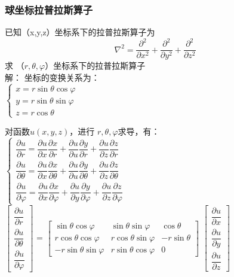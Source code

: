 \begin{frame}
	\frametitle{ 球坐标拉普拉斯算子 }
	已知（x,y,z）坐标系下的拉普拉斯算子为
	\begin{equation*}
		\nabla ^{2}  = \dfrac{\partial ^2}{\partial x^2} +\dfrac{\partial^2 }{\partial y^2} +\dfrac{\partial^2  }{\partial z^2}
	\end{equation*}
	求 （$r, \theta, \varphi $）坐标系下的拉普拉斯算子 \\ \vspace{0.3cm}
	\alert{解：}  坐标的变换关系为：\\
	$\begin{cases}
		x= r\sin \theta \cos \varphi \\
		y= r\sin \theta \sin \varphi \\
		z=r\cos \theta
	\end{cases} $
\end{frame}	

\begin{frame}
	对函数$u(x,y,z)$，进行 $r, \theta, \varphi $求导，有：\\
	{\small $\begin{cases}
		\dfrac{\partial {u}}{\partial {r}}=\dfrac{\partial {u}}{\partial x} \dfrac{\partial {x}}{\partial {r}}+\dfrac{\partial u}{\partial {u}} \dfrac{\partial {y}}{\partial {r}}+\dfrac{\partial u}{\partial z} \dfrac{\partial z}{\partial {r}} \\
		\dfrac{\partial {u}}{\partial \theta}=\dfrac{\partial {u}}{\partial x} \dfrac{\partial{x}}{\partial \theta}+\dfrac{\partial u}{\partial {u}} \dfrac{\partial {y}}{\partial \theta}+\dfrac{\partial{u}}{\partial z} \dfrac{\partial z}{\partial \theta} \\
		\dfrac{\partial {u}}{\partial \varphi}=\dfrac{\partial u}{\partial x} \dfrac{\partial{x}}{\partial \varphi}+\dfrac{\partial u}{\partial y} \dfrac{\partial y}{\partial \varphi}+\dfrac{\partial u}{\partial z} \dfrac{\partial z}{\partial \varphi}
	\end{cases} $}\\
	{\small $\left[\begin{array}{ccc}
		\dfrac{\partial u}{\partial r} \\
		\dfrac{\partial u}{\partial \theta} \\
		\dfrac{\partial u}{\partial \varphi}
	\end{array}\right]$
	=
	$\left[\begin{array}{ccc}
		\sin \theta \cos \varphi & \sin \theta \sin \varphi & \cos \theta \\
		r \cos \theta \cos \varphi & r \cos \theta \sin \varphi & -r \sin \theta \\
		-r \sin \theta \sin \varphi & r \sin \theta \cos \varphi & 0
	\end{array}\right]$
	$\left[\begin{array}{ccc}
		\dfrac{\partial u}{\partial x} \\
		\dfrac{\partial u}{\partial y} \\
		\dfrac{\partial u}{\partial z}
	\end{array}\right]$
	}
\end{frame}	

